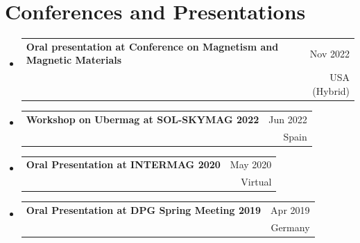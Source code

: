 \documentclass[A4,11pt]{article}
\makeatletter
\newcommand{\CVSubheading}[4]{
  \vspace{-2pt}\item
    \begin{tabular*}{0.97\textwidth}[t]{l@{\extracolsep{\fill}}r}
      \textbf{#1} & #2 \\
      \small#3 & \small #4 \\
    \end{tabular*}\vspace{-7pt}
}
\newcommand{\CVSubHeadingListStart}{\begin{itemize}[leftmargin=0.5cm, label={}]}
\newcommand{\CVSubHeadingListEnd}{\end{itemize}}
\makeatother
\begin{document}

\section{Conferences and Presentations}
  \CVSubHeadingListStart
    \CVSubheading
    {Oral presentation at Conference on Magnetism and Magnetic Materials}{Nov 2022}
    {}{USA (Hybrid)}
    \CVSubheading
    {Workshop on Ubermag at SOL-SKYMAG 2022}{Jun 2022}
    {}{Spain}
    \CVSubheading
    {Oral Presentation at INTERMAG 2020}{May 2020}
    {}{Virtual}
    \CVSubheading
    {Oral Presentation at DPG Spring Meeting 2019}{Apr 2019}
    {}{Germany}
  \CVSubHeadingListEnd
\end{document}
